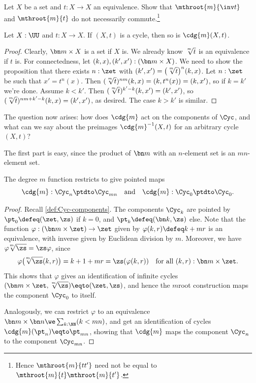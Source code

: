 \begin{xca}\label{xca:root-NOT-pres-inv}
Let $X$ be a set and $t:X\to X$ an equivalence.
Show that $\mthroot{m}{\inv t}$ and $\mthroot{m}{t}$
do not necessarily commute.\footnote{%
Hence $\mthroot{m}{tt'}$ need not be equal
to $\mthroot{m}{t}\mthroot{m}{t'}$. 
}
\end{xca}

\begin{lemma}\label{lem:root-pres-cycle} 
Let $X:\UU$ and $t:X\to X$.
If $(X,t)$ is a cycle, then so is $\cdg{m}(X,t)$.
\end{lemma}
\begin{proof}
  Clearly, $\bn m\times X$ is a \nonempty set if $X$ is.
  We already know $\sqrt[\uproot{2}m]{t}$ is an equivalence if $t$ is.
  For connectedness, let $(k,x),(k',x'): (\bn m\times X)$.
  We need to show the proposition that there exists $n:\zet$
  with $(k',x') = \bigl(\sqrt[\uproot{2}m]t\bigr)^n(k,x)$.
  Let $n:\zet$ be such that $x' = t^n(x)$.
  Then $(\sqrt[\uproot{2}m]t)^{nm}(k,x) = (k,t^n(x)) = (k,x')$,
  so if $k=k'$ we're done.
  Assume $k<k'$. Then $(\sqrt[\uproot{2}m]t)^{k'-k}(k,x') = (k',x')$,
  so $(\sqrt[\uproot{2}m]t)^{nm+k'-k}(k,x) = (k',x')$, as desired.
  The case $k>k'$ is similar.
\end{proof}

The question now arises: how does $\cdg{m}$ act on the components of $\Cyc$,
and what can we say about the preimages $\cdg{m}^{-1}(X,t)$
for an arbitrary cycle $(X,t)$?

The first part is easy, since the product of $\bn m$ with an $n$-element set
is an $mn$-element set.
\begin{lemma} \label{lem:deg-m-on-Cyc}
  The degree $m$ function restricts to give pointed maps
  \[
    \cdg{m} : \Cyc_n \ptdto \Cyc_{mn} \quad\text{and}\quad
    \cdg{m} : \Cyc_0 \ptdto \Cyc_0.
  \]
\end{lemma}
\begin{proof}
  Recall \cref{def:Cyc-components}. The components $\Cyc_k$ are pointed
  by $\pt_0\defeq(\zet,\zs)$ if $k=0$, and $\pt_k\defeq(\bn k,\zs)$ else.
  Note
  that the function $\varphi : (\bn m\times \zet) \to \zet$
  given by $\varphi(k,r) \defeq k+mr$ is an equivalence,
  with inverse given by Euclidean division by $m$.
  Moreover, we have ${\varphi\!\sqrt[\uproot{2}m]\zs} = {\zs\varphi}$, since
  \[
    \varphi\bigl(\!\sqrt[\uproot{2}m]\zs(k,r)\bigr)
    = k+1+mr = \zs(\varphi(k,r))
    \quad\text{for all $(k,r):\bn m\times \zet$}.
  \]
  This shows that $\varphi$ gives an identification of infinite cycles
  $(\bn m\times\zet, \sqrt[\uproot{2}m]\zs) \eqto (\zet,\zs)$,
  and hence the $m$\th root construction maps the component $\Cyc_0$ to itself.

  Analogously, we can restrict $\varphi$ to
  an equivalence $\bn m \times \bn n \we \sum_{k:\NN}(k<mn)$,
  and get an identification of cycles $\cdg{m}(\pt_n) \eqto \pt_{mn}$,
  showing that $\cdg{m}$ maps the component $\Cyc_n$ to the component $\Cyc_{mn}$.
\end{proof}

